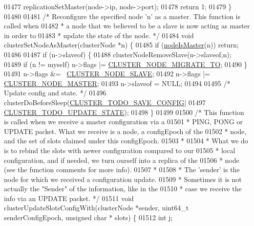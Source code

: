 \begin{DoxyCode}
{{{{{{{{{{{{{{{{{{{{{01477         replicationSetMaster(node->ip, node->port);
01478     \textcolor{keywordflow}{return} 1;
01479 \}
01480 
01481 \textcolor{comment}{/* Reconfigure the specified node 'n' as a master. This function is called when}
01482 \textcolor{comment}{ * a node that we believed to be a slave is now acting as master in order to}
01483 \textcolor{comment}{ * update the state of the node. */}
01484 \textcolor{keywordtype}{void} clusterSetNodeAsMaster(clusterNode *n) \{
01485     \textcolor{keywordflow}{if} (\hyperlink{cluster_8h_a2d8e84269474d8750565fb3fb67aa436}{nodeIsMaster}(n)) \textcolor{keywordflow}{return};
01486 
01487     \textcolor{keywordflow}{if} (n->slaveof) \{
01488         clusterNodeRemoveSlave(n->slaveof,n);
01489         \textcolor{keywordflow}{if} (n != myself) n->flags |= \hyperlink{cluster_8h_a1d5a62356ed9f5986613c2315a358119}{CLUSTER\_NODE\_MIGRATE\_TO};
01490     \}
01491     n->flags &= ~\hyperlink{cluster_8h_a34b7bfd1f810397be68c3b5d13d4d134}{CLUSTER\_NODE\_SLAVE};
01492     n->flags |= \hyperlink{cluster_8h_a5dcea846e31b55b73244aa2e496a31bf}{CLUSTER\_NODE\_MASTER};
01493     n->slaveof = NULL;
01494 
01495     \textcolor{comment}{/* Update config and state. */}
01496     clusterDoBeforeSleep(\hyperlink{cluster_8h_a0ae5ff08fbae3c655012b4de8bfc327d}{CLUSTER\_TODO\_SAVE\_CONFIG}|
01497                          \hyperlink{cluster_8h_abea0d393cba342261e4a7e6fb745f388}{CLUSTER\_TODO\_UPDATE\_STATE});
01498 \}
01499 
01500 \textcolor{comment}{/* This function is called when we receive a master configuration via a}
01501 \textcolor{comment}{ * PING, PONG or UPDATE packet. What we receive is a node, a configEpoch of the}
01502 \textcolor{comment}{ * node, and the set of slots claimed under this configEpoch.}
01503 \textcolor{comment}{ *}
01504 \textcolor{comment}{ * What we do is to rebind the slots with newer configuration compared to our}
01505 \textcolor{comment}{ * local configuration, and if needed, we turn ourself into a replica of the}
01506 \textcolor{comment}{ * node (see the function comments for more info).}
01507 \textcolor{comment}{ *}
01508 \textcolor{comment}{ * The 'sender' is the node for which we received a configuration update.}
01509 \textcolor{comment}{ * Sometimes it is not actually the "Sender" of the information, like in the}
01510 \textcolor{comment}{ * case we receive the info via an UPDATE packet. */}
01511 \textcolor{keywordtype}{void} clusterUpdateSlotsConfigWith(clusterNode *sender, uint64\_t senderConfigEpoch, \textcolor{keywordtype}{unsigned} \textcolor{keywordtype}{char} *
      slots) \{
01512     \textcolor{keywordtype}{int} j;
}}}}}}}}}}}}}}}}}}}}}
\end{DoxyCode}
